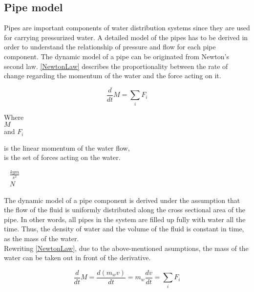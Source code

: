 \subsection{Pipe model} 
\label{PipeModel}
Pipes are important components of water distribution systems since they are used for carrying pressurized water. A detailed model of the pipes has to be derived in order to understand the relationship of pressure and flow for each pipe component.  
%
The dynamic model of a pipe can be originated from Newton's second law. \eqref{NewtonLaw} describes the proportionality between the rate of change regarding the momentum of the water and the force acting on it.

\begin{equation}
  \frac{d}{dt} M = \sum_i F_i
  \label{NewtonLaw}
\end{equation} 

\begin{minipage}[t]{0.20\textwidth}
Where\\
\hspace*{8mm} $M$ \\
and \hspace*{0.7mm}  $F_i$ 
\end{minipage}
\begin{minipage}[t]{0.68\textwidth}
\vspace*{2mm}
is the linear momentum of the water flow,\\
is the set of forces acting on the water.
\end{minipage}
\begin{minipage}[t]{0.10\textwidth}
\vspace*{2mm}
\textcolor{White}{te}$\unit{\frac{kgm}{s^2}}$\\
\textcolor{White}{te}$\unit{N}$
\end{minipage}

The dynamic model of a pipe component is derived under the assumption that the flow of the fluid is uniformly distributed along the cross sectional area of the pipe. In other words, all pipes in the system are filled up fully with water all the time. Thus, the density of water and the volume of the fluid is constant in time, as the mass of the water.
\\
Rewriting \eqref{NewtonLaw}, due to the above-mentioned asumptions, the mass of the water can be taken out in front of the derivative.

\begin{equation}
  \frac{d}{dt} M = {\frac{d(m_w v)}{dt}} = m_w \frac{dv}{dt} = \sum_i F_i
\end{equation} 

